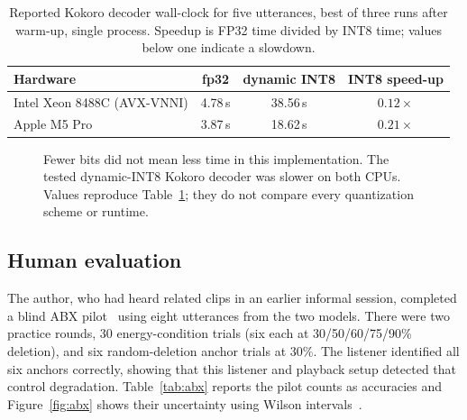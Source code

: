 \documentclass[11pt,a4paper]{article}
\begin{document}
\begin{table}[htbp]
\centering
\caption{Reported Kokoro decoder wall-clock for five utterances, best of three runs after warm-up, single process. Speedup is FP32 time divided by INT8 time; values below one indicate a slowdown.}
\label{tab:int8}
\small
\begin{tabular}{@{}lccc@{}}
\toprule
\textbf{Hardware} & \textbf{fp32} & \textbf{dynamic INT8} & \textbf{INT8 speed-up} \\
\midrule
Intel Xeon 8488C (AVX-VNNI) & 4.78\,s & 38.56\,s & $0.12\times$ \\
Apple M5 Pro & 3.87\,s & 18.62\,s & $0.21\times$ \\
\bottomrule
\end{tabular}
\end{table}


\begin{figure}[tbp]
\centering
{}

\caption{Fewer bits did not mean less time in this implementation. The tested dynamic-INT8 Kokoro decoder was slower on both CPUs. Values reproduce Table~\ref{tab:int8}; they do not compare every quantization scheme or runtime.}
\label{fig:quant}
\end{figure}


\subsection{Human evaluation}
\label{sec:abx}
The author, who had heard related clips in an earlier informal session, completed a blind ABX pilot~\cite{clark1982abx} using eight utterances from the two models. There were two practice rounds, 30 energy-condition trials (six each at 30/50/60/75/90\% deletion), and six random-deletion anchor trials at 30\%. The listener identified all six anchors correctly, showing that this listener and playback setup detected that control degradation. Table~\ref{tab:abx} reports the pilot counts as accuracies and Figure~\ref{fig:abx} shows their uncertainty using Wilson intervals~\cite{wilson1927probable}.
\end{document}
